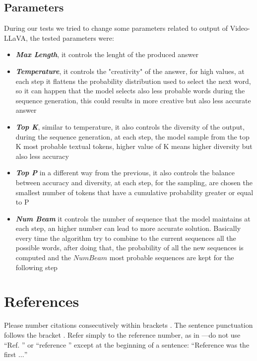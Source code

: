 \documentclass[conference]{IEEEtran}
\begin{document}
\subsection{Parameters}
During our tests we tried to change some parameters related to output of Video-LLaVA, the tested parameters were:
\\
\begin{itemize}
    \item \textit{\textbf{Max Length}}, it controls the lenght of the produced answer
    \item \textit{\textbf{Temperature}}, it controls the "creativity" of the answer, for high values, at each step it flattens the probability distribution used to select the next word, so it can happen that the model selects also less probable words during the sequence generation, this could results in more creative but also less accurate answer
    \item \textit{\textbf{Top K}}, similar to temperature, it also controls the diversity of the output, during the sequence generation, at each step, the model sample from the top K most probable textual tokens, higher value of K means higher diversity but also less accuracy
    \item \textit{\textbf{Top P}} in a different way from the previous, it also controls the balance between accuracy and diversity, at each step, for the sampling, are chosen the smallest number of tokens that have a cumulative probability greater or equal to P
     \item \textit{\textbf{Num Beam}} it controls the number of sequence that the model maintains at each step, an higher number can lead to more accurate solution. Basically every time the algorithm try to combine to the current sequences all the possible words, after doing that, the probability of all the new sequences is computed and the $Num Beam$ most probable sequences are kept for the following step
    
\end{itemize}

\section*{References}

Please number citations consecutively within brackets \cite{b1}. The 
sentence punctuation follows the bracket \cite{b2}. Refer simply to the reference 
number, as in \cite{b3}---do not use ``Ref. \cite{b3}'' or ``reference \cite{b3}'' except at 
the beginning of a sentence: ``Reference \cite{b3} was the first $\ldots$''
\end{document}
